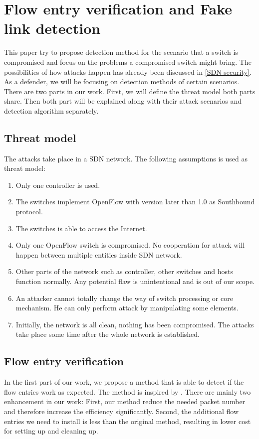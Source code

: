 \chapter{Flow entry verification and Fake link detection}
This paper try to propose detection method for the scenario that a switch is compromised and focus on the problems a compromised switch might bring. The possibilities of how attacks happen has already been discussed in \ref{SDN security}. As a defender, we will be focusing on detection methods of certain scenarios. There are two parts in our work. First, we will define the threat model both parts share. Then both part will be explained along with their attack scenarios and detection algorithm separately.

\section{Threat model}
The attacks take place in a SDN network. The following assumptions is used as threat model:
\begin{enumerate}
\item
Only one controller is used.
\item
The switches implement OpenFlow with version later than 1.0 as Southbound protocol.
\item
The switches is able to access the Internet. 
\item
Only one OpenFlow switch is compromised. No cooperation for attack will happen between multiple entities inside SDN network.
\item
Other parts of the network such as controller, other switches and hosts function normally. Any potential flaw is unintentional and is out of our scope.
\item
An attacker cannot totally change the way of switch processing or core mechanism. He can only perform attack by manipulating some elements.
\item
Initially, the network is all clean, nothing has been compromised. The attacks take place some time after the whole network is established. 
\end{enumerate}

\section{Flow entry verification}
In the first part of our work, we propose a method that is able to detect if the flow entries work as expected. The method is inspired by \cite{CKGL15}. There are mainly two enhancement in our work: First, our method reduce the needed packet number and therefore increase the efficiency significantly. Second, the additional flow entries we need to install is less than the original method, resulting in lower cost for setting up and cleaning up. 


